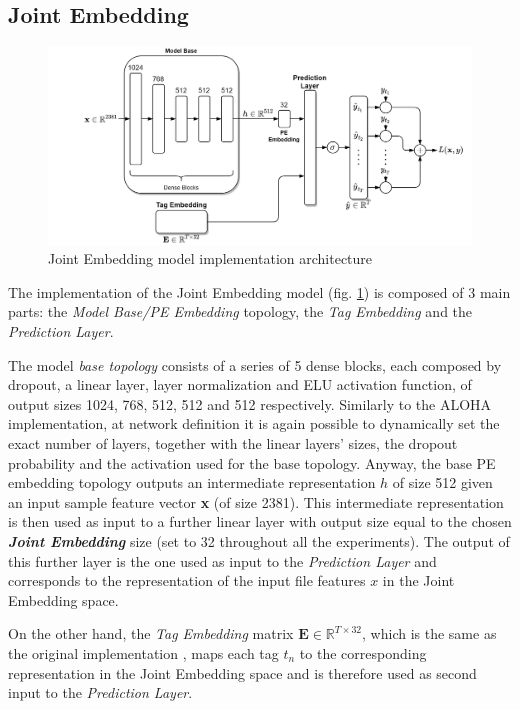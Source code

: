 \documentclass[pdfa%
,cucitura%
]{toptesi}
\begin{document}
\subsection{Joint Embedding}\label{sec:jointEmbeddingModelImplementation}
\begin{figure}[h!]
	\centering
	\includegraphics[width=\textwidth]{./images/Joint_Embedding_Implementation.png}
	\caption[Joint Embedding model implementation architecture]{Joint Embedding model implementation architecture}
	\label{fig:Joint_Embedding_Implementation_model}
\end{figure}

The implementation of the Joint Embedding model (fig. \ref{fig:Joint_Embedding_Implementation_model}) is composed of 3 main parts: the \textit{Model Base/PE Embedding} topology, the \textit{Tag Embedding} and the \textit{Prediction Layer}.

The model \textit{base topology} consists of a series of 5 dense blocks, each composed by dropout, a linear layer, layer normalization and ELU activation function, of output sizes 1024, 768, 512, 512 and 512 respectively. Similarly to the ALOHA implementation, at network definition it is again possible to dynamically set the exact number of layers, together with the linear layers' sizes, the dropout probability and the activation used for the base topology. Anyway, the base PE embedding topology outputs an intermediate representation $h$ of size 512 given an input sample feature vector \textbf{x} (of size 2381). This intermediate representation is then used as input to a further linear layer with output size equal to the chosen \textit{\textbf{Joint Embedding}} size (set to 32 throughout all the experiments). The output of this further layer is the one used as input to the \textit{Prediction Layer} and corresponds to the representation of the input file features $x$ in the Joint Embedding space.

On the other hand, the \textit{Tag Embedding} matrix $\textbf{E} \in \mathbb{R}^{T \times 32}$, which is the same as the original implementation \cite{DucauAMDATSE}, maps each tag $t_n$ to the corresponding representation in the Joint Embedding space and is therefore used as second input to the \textit{Prediction Layer}.
\end{document}
